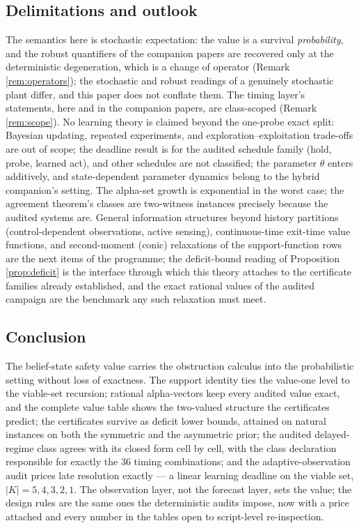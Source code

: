 \documentclass[10pt,twocolumn]{article}
\theoremstyle{plain}
\theoremstyle{definition}
\theoremstyle{remark}
\begin{document}
\subsection{Delimitations and outlook}\label{scope}

The semantics here is stochastic expectation: the value is a survival
\emph{probability}, and the robust quantifiers of the companion papers
are recovered only at the deterministic degeneration, which is a change
of operator (Remark \ref{rem:operators}); the stochastic and robust
readings of a genuinely stochastic plant differ, and this paper does not
conflate them. The timing layer's statements, here and in the companion
papers, are class-scoped (Remark \ref{rem:scope}). No learning theory is
claimed beyond the one-probe exact split: Bayesian updating, repeated
experiments, and exploration--exploitation trade-offs are out of scope;
the deadline result is for the audited schedule family (hold, probe,
learned act), and other schedules are not classified; the parameter
\(\theta\) enters additively, and state-dependent parameter dynamics
belong to the hybrid companion's setting. The alpha-set growth is
exponential in the worst case; the agreement theorem's classes are
two-witness instances precisely because the audited systems are. General
information structures beyond history partitions (control-dependent
observations, active sensing), continuous-time exit-time value functions,
and second-moment (conic) relaxations of the support-function rows are
the next items of the programme; the deficit-bound reading of
Proposition \ref{prop:deficit} is the interface through which this
theory attaches to the certificate families already established, and the
exact rational values of the audited campaign are the benchmark any
such relaxation must meet.

\subsection{Conclusion}\label{conclusion}

The belief-state safety value carries the obstruction calculus into the
probabilistic setting without loss of exactness. The support identity
ties the value-one level to the viable-set recursion; rational
alpha-vectors keep every audited value exact, and the complete value
table shows the two-valued structure the certificates predict; the
certificates survive as deficit lower bounds, attained on natural
instances on both the symmetric and the asymmetric prior; the audited
delayed-regime class agrees with its closed form cell by cell, with the
class declaration responsible for exactly the 36 timing combinations;
and the adaptive-observation audit prices late resolution exactly --- a
linear learning deadline on the viable set, \(|K| = 5, 4, 3, 2, 1\). The
observation layer, not the forecast layer, sets the value; the design
rules are the same ones the deterministic audits impose, now with a
price attached and every number in the tables open to script-level
re-inspection.
\end{document}
